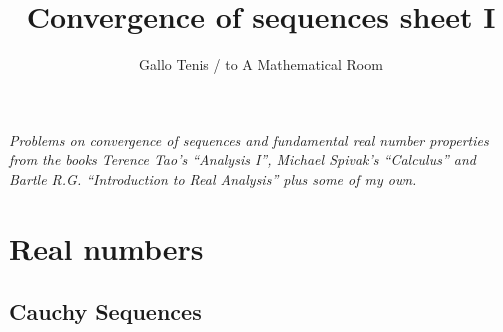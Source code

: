 \documentclass{article}
\title{Convergence of sequences sheet I}
\author{Gallo Tenis / to A Mathematical Room}
\theoremstyle{remark}
\begin{document}
\maketitle

\begin{center}
    \textit{Problems on convergence of sequences and fundamental real number properties from the books Terence Tao's ``Analysis I'',
    Michael Spivak's ``Calculus'' and Bartle R.G. ``Introduction to Real Analysis'' plus some of my own.
    } 
\end{center}
\section{Real numbers}
    \subsection*{Cauchy Sequences}
\end{document}
